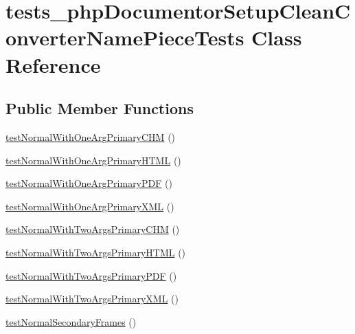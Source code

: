 \hypertarget{classtests__php_documentor_setup_clean_converter_name_piece_tests}{\section{tests\-\_\-php\-Documentor\-Setup\-Clean\-Converter\-Name\-Piece\-Tests \-Class \-Reference}
\label{classtests__php_documentor_setup_clean_converter_name_piece_tests}
}
\subsection*{\-Public \-Member \-Functions}
\begin{DoxyCompactItemize}
\item 
\hyperlink{classtests__php_documentor_setup_clean_converter_name_piece_tests_a54de953d837e332c16bf5faca04b60f5}{test\-Normal\-With\-One\-Arg\-Primary\-C\-H\-M} ()
\item 
\hyperlink{classtests__php_documentor_setup_clean_converter_name_piece_tests_a7c873e0b4c2f2e6de0dd240b6ba4f649}{test\-Normal\-With\-One\-Arg\-Primary\-H\-T\-M\-L} ()
\item 
\hyperlink{classtests__php_documentor_setup_clean_converter_name_piece_tests_a5bf5e16e65128d9dd359aa44e59d08cb}{test\-Normal\-With\-One\-Arg\-Primary\-P\-D\-F} ()
\item 
\hyperlink{classtests__php_documentor_setup_clean_converter_name_piece_tests_a1faffbb4f2f2484492398ad35e4c50e1}{test\-Normal\-With\-One\-Arg\-Primary\-X\-M\-L} ()
\item 
\hyperlink{classtests__php_documentor_setup_clean_converter_name_piece_tests_ae3303b5e7c57891309925acd52a318d7}{test\-Normal\-With\-Two\-Args\-Primary\-C\-H\-M} ()
\item 
\hyperlink{classtests__php_documentor_setup_clean_converter_name_piece_tests_a4f41e5653d3fd1280615f90113aeaf20}{test\-Normal\-With\-Two\-Args\-Primary\-H\-T\-M\-L} ()
\item 
\hyperlink{classtests__php_documentor_setup_clean_converter_name_piece_tests_a1192c88561fa919a1d12ba95522522d6}{test\-Normal\-With\-Two\-Args\-Primary\-P\-D\-F} ()
\item 
\hyperlink{classtests__php_documentor_setup_clean_converter_name_piece_tests_ab12449d10a1f3fd3367b1eb7c5f9b011}{test\-Normal\-With\-Two\-Args\-Primary\-X\-M\-L} ()
\item 
\hyperlink{classtests__php_documentor_setup_clean_converter_name_piece_tests_aeb2a965cc87cebdcdc56fa3aae6c5f28}{test\-Normal\-Secondary\-Frames} ()

\end{DoxyCompactItemize}
